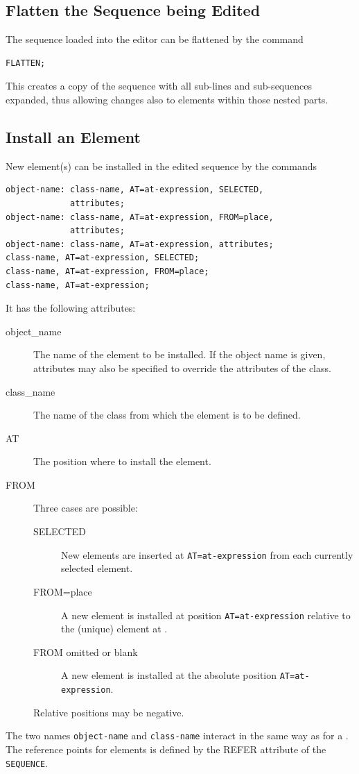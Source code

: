 \subsection{Flatten the Sequence being Edited}
\label{sec:editflat}
The sequence loaded into the editor can be flattened by the command
\begin{verbatim}
FLATTEN;
\end{verbatim}
This creates a copy of the sequence with all sub-lines and
sub-sequences expanded,
thus allowing changes also to elements within those nested parts.

\subsection{Install an Element}
\label{sec:editinstall}
New element(s) can be installed in the edited sequence by the commands
\begin{verbatim}
object-name: class-name, AT=at-expression, SELECTED, 
             attributes;
object-name: class-name, AT=at-expression, FROM=place, 
             attributes;
object-name: class-name, AT=at-expression, attributes;
class-name, AT=at-expression, SELECTED;
class-name, AT=at-expression, FROM=place;
class-name, AT=at-expression;
\end{verbatim}
It has the following attributes:
\begin{description}
\item[object\_name]
The name of the element to be installed.
If the object name is given, attributes may also be specified to
override the attributes of the class.
\item[class\_name]
The name of the class from which the element is to be defined.
\item[AT]
  The position where to install the element.
\item[FROM]
  Three cases are possible:
  \begin{description}
  \item[SELECTED]
    New elements are inserted at \texttt{AT=at-expression} from each
    currently selected element.
  \item[FROM=place]
    A new element is installed at position \texttt{AT=at-expression}
    relative to the (unique) element at .
  \item[FROM omitted or blank]
    A new element is installed at the absolute position
    \texttt{AT=at-expression}. 
  \end{description}
  Relative positions may be negative.
\end{description}
The two names \texttt{object-name} and \texttt{class-name} interact 
in the same way as for a .
The reference points for elements is defined by the REFER attribute of the 
\texttt{SEQUENCE}.

